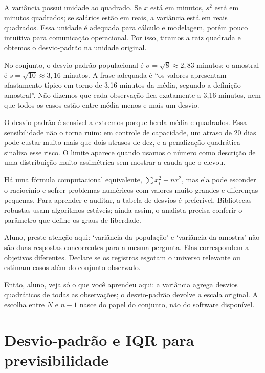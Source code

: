 A variância possui unidade ao quadrado. Se $x$ está em minutos, $s^2$ está em minutos quadrados; se salários estão em reais, a variância está em reais quadrados. Essa unidade é adequada para cálculo e modelagem, porém pouco intuitiva para comunicação operacional. Por isso, tiramos a raiz quadrada e obtemos o desvio-padrão na unidade original.

No conjunto, o desvio-padrão populacional é $\sigma=\sqrt{8}\approx2{,}83$ minutos; o amostral é $s=\sqrt{10}\approx3{,}16$ minutos. A frase adequada é ``os valores apresentam afastamento típico em torno de 3,16 minutos da média, segundo a definição amostral''. Não dizemos que cada observação fica exatamente a 3,16 minutos, nem que todos os casos estão entre média menos e mais um desvio.

O desvio-padrão é sensível a extremos porque herda média e quadrados. Essa sensibilidade não o torna ruim: em controle de capacidade, um atraso de 20 dias pode custar muito mais que dois atrasos de dez, e a penalização quadrática sinaliza esse risco. O limite aparece quando usamos o número como descrição de uma distribuição muito assimétrica sem mostrar a cauda que o elevou.

Há uma fórmula computacional equivalente, $\sum x_i^2-n\bar{x}^2$, mas ela pode esconder o raciocínio e sofrer problemas numéricos com valores muito grandes e diferenças pequenas. Para aprender e auditar, a tabela de desvios é preferível. Bibliotecas robustas usam algoritmos estáveis; ainda assim, o analista precisa conferir o parâmetro que define os graus de liberdade.

\begin{GuidedBox}
Aluno, preste atenção aqui: `variância da população' e `variância da amostra' não são duas respostas concorrentes para a mesma pergunta. Elas correspondem a objetivos diferentes. Declare se os registros esgotam o universo relevante ou estimam casos além do conjunto observado.
\end{GuidedBox}

\begin{SummaryBox}
Então, aluno, veja só o que você aprendeu aqui: a variância agrega desvios quadráticos de todas as observações; o desvio-padrão devolve a escala original. A escolha entre $N$ e $n-1$ nasce do papel do conjunto, não do software disponível.
\end{SummaryBox}

\section{Desvio-padrão e IQR para previsibilidade}

